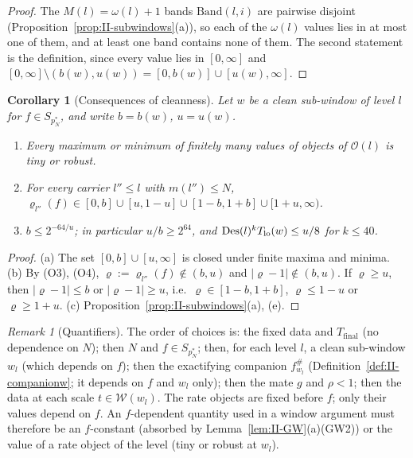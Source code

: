 \documentclass[10pt]{amsart}
\newtheorem{corollary}[theorem]{Corollary}
\theoremstyle{definition}
\theoremstyle{remark}
\newtheorem{remark}[theorem]{Remark}
\begin{document}
\begin{proof}
The $M(l)=\omega(l)+1$ bands $\mathrm{Band}(l,i)$ are pairwise disjoint
(Proposition~\ref{prop:II-subwindows}(a)), so each of the $\omega(l)$
values lies in at most one of them, and at least one band contains none of
them.  The second statement is the definition, since every value lies in
$[0,\infty]$ and $[0,\infty]\setminus(b(w),u(w))=[0,b(w)]\cup
[u(w),\infty]$.
\end{proof}

\begin{corollary}[Consequences of cleanness]\label{cor:II-clean}
Let $w$ be a clean sub-window of level $l$ for $f\in S_{p_N^*}$, and
write $b=b(w)$, $u=u(w)$.
\begin{enumerate}
\item[(a)] Every maximum or minimum of finitely many values of objects of
$\mathcal O(l)$ is tiny or robust.
\item[(b)] For every carrier $l''\le l$ with $m(l'')\le N$,
$\varrho_{l''}(f)\in[0,b]\cup[u,1-u]\cup[1-b,1+b]\cup[1+u,\infty)$.
\item[(c)] $b\le2^{-64/u}$; in particular $u/b\ge2^{64}$, and
$\mathrm{Des}(l)^kT_{\rm lo}(w)\le u/8$ for $k\le40$.
\end{enumerate}
\end{corollary}

\begin{proof}
(a) The set $[0,b]\cup[u,\infty]$ is closed under finite maxima and
minima.  (b) By (O3), (O4), $\varrho:=\varrho_{l''}(f)\notin(b,u)$ and
$|\varrho-1|\notin(b,u)$.  If $\varrho\ge u$, then $|\varrho-1|\le b$ or
$|\varrho-1|\ge u$, i.e.\ $\varrho\in[1-b,1+b]$, $\varrho\le1-u$ or $\varrho\ge1+u$.
(c) Proposition~\ref{prop:II-subwindows}(a), (e).
\end{proof}

\begin{remark}[Quantifiers]\label{rem:II-quantifiers}
The order of choices is: the fixed data and $T_{\mathrm{final}}$ (no
dependence on $N$); then $N$ and $f\in S_{p_N^*}$; then, for each level
$l$, a clean sub-window $w_l$ (which depends on $f$); then the
exactifying companion $f^\#_{w_l}$ (Definition~\ref{def:II-companionw}; it
depends on $f$ and $w_l$ only); then the mate $g$ and $\rho<1$; then the
data at each scale $t\in\mathcal W(w_l)$.  The rate
objects are fixed before $f$; only their values depend on $f$.  An
$f$-dependent quantity used in a window argument must therefore be an
$f$-constant (absorbed by Lemma~\ref{lem:II-GW}(a)(GW2)) or the value of
a rate object of the level (tiny or robust at $w_l$).
\end{remark}
\end{document}
